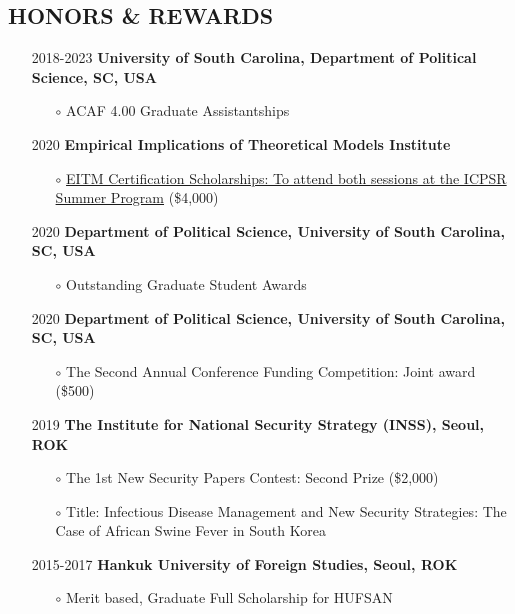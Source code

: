 \documentclass[11pt]{res} %
\begin{document}
\begin{resume}
\section{HONORS \& REWARDS} 
\begin{itemize}[wide = 0pt] \itemsep -2pt 
	\item[2018-2023] \textbf{University of South Carolina, Department of Political Science, SC, USA}
	\begin{itemize} \itemsep -2pt 
		\item[$\circ$] ACAF 4.00 Graduate Assistantships
	\end{itemize} \itemsep -2pt 
	\item[2020] \textbf{Empirical Implications of Theoretical Models Institute}
	\begin{itemize} \itemsep -2pt 
		\item[$\circ$] \href{https://52.2.147.143/icpsrweb/content/sumprog/scholarships/winners-2020.html}{EITM Certification Scholarships: To attend both sessions at the ICPSR Summer Program} (\$4,000)
	\end{itemize} 
	\item[2020] \textbf{Department of Political Science, University of South Carolina, SC, USA}
	\begin{itemize} \itemsep -2pt 
		\item[$\circ$] Outstanding Graduate Student Awards
	\end{itemize} 
	\item[2020] \textbf{Department of Political Science, University of South Carolina, SC, USA}
	\begin{itemize} \itemsep -2pt 
		\item[$\circ$] The Second Annual Conference Funding Competition: Joint award (\$500)
	\end{itemize} 
	\item[2019] \textbf{The Institute for National Security Strategy (INSS), Seoul, ROK}
	\begin{itemize} \itemsep -2pt 
		\item[$\circ$] The 1st New Security Papers Contest: Second Prize (\$2,000)
		\item[$\circ$] Title: Infectious Disease Management and New Security Strategies: The Case of African Swine Fever in South Korea
	\end{itemize}
	\item[2015-2017] \textbf{Hankuk University of Foreign Studies, Seoul, ROK}
	\begin{itemize} \itemsep -2pt 
		\item[$\circ$] Merit based, Graduate Full Scholarship for HUFSAN
	\end{itemize}
\end{itemize}


\end{resume}
\end{document}
